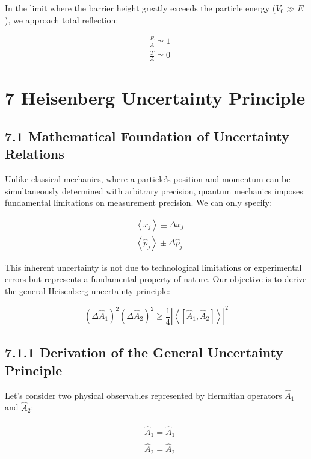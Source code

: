 \documentclass[italian]{HKNdocument}
\begin{document}
In the limit where the barrier height greatly exceeds the particle energy ($V_0 \gg E$), we approach total reflection:

\begin{align*}
& \frac{R}{A} \simeq 1  \tag{6.80}\\
& \frac{T}{A} \simeq 0
\end{align*}

\section*{7 Heisenberg Uncertainty Principle}
\subsection*{7.1 Mathematical Foundation of Uncertainty Relations}

Unlike classical mechanics, where a particle's position and momentum can be simultaneously determined with arbitrary precision, quantum mechanics imposes fundamental limitations on measurement precision. We can only specify:

\begin{align*}
& \left\langle x_{j}\right\rangle \pm \Delta x_{j} \\
& \left\langle\hat{p}_{j}\right\rangle \pm \Delta \hat{p}_{j} \tag{7.1}
\end{align*}

This inherent uncertainty is not due to technological limitations or experimental errors but represents a fundamental property of nature. Our objective is to derive the general Heisenberg uncertainty principle:

\begin{equation*}
\left(\Delta \hat{A}_{1}\right)^{2}\left(\Delta \hat{A}_{2}\right)^{2} \geq \frac{1}{4}\left|\left\langle\left[\hat{A}_{1}, \hat{A}_{2}\right]\right\rangle\right|^{2} \tag{7.2}
\end{equation*}


\subsection*{7.1.1 Derivation of the General Uncertainty Principle}

Let's consider two physical observables represented by Hermitian operators $\hat{A}_1$ and $\hat{A}_2$:

\begin{align*}
& \hat{A}_{1}^{\dagger}=\hat{A}_{1} \\
& \hat{A}_{2}^{\dagger}=\hat{A}_{2} \tag{7.3}
\end{align*}
\end{document}
